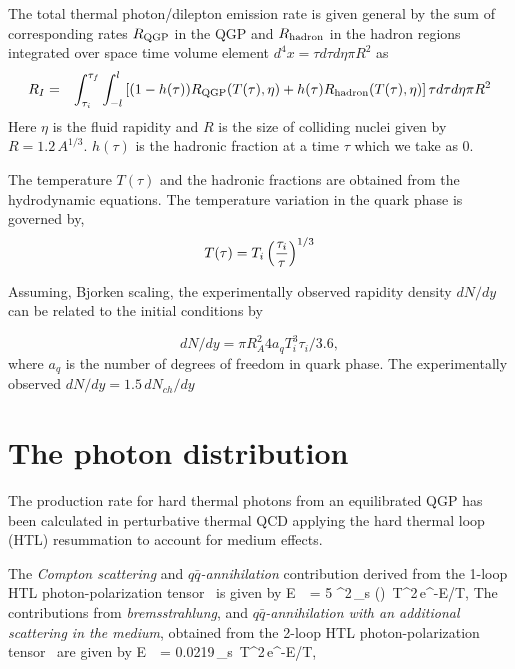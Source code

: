   The total thermal photon/dilepton emission rate is given general by 
the sum of corresponding rates $R_{\rm QGP}$ in the QGP and $R_{\rm hadron}$ in the hadron regions 
integrated over space time volume element $d^4x = \tau d\tau d\eta \pi R^2$ as
\begin{eqnarray}\label{}
R_I  &=& \int_{\tau_i}^{\tau_f} \int_{-l}^{l} 
      \left[(1-h(\tau)) R_{\rm QGP}(T(\tau),\eta) 
   + h(\tau)  R_{\rm hadron}(T(\tau),\eta) \right]\tau d\tau d\eta \pi R^2
\end{eqnarray}
Here $\eta$ is the fluid rapidity and $R$ is the size of colliding 
nuclei given by $R=1.2\, A^{1/3}$. $h(\tau)$ is the hadronic fraction
at a time $\tau$ which we take as 0. 

 The temperature $T(\tau)$ and the hadronic fractions are
obtained from the hydrodynamic equations. The temperature variation
in the quark phase is governed by,
\begin{eqnarray}\label{}
T(\tau) = T_i \left({\tau_i \over \tau}\right)^{1/3}
\end{eqnarray}

 Assuming, Bjorken scaling, the experimentally observed rapidity 
density $dN/dy$ can be related to the initial conditions by

\begin{equation}
dN/dy = \pi R_A^2 4 a_q T_i^3 \tau_i/3.6,
\end{equation}
where $a_q$ is the number of degrees of freedom in quark phase.
The experimentally observed $dN/dy=1.5\, dN_{ch}/dy$ 


\section{The photon distribution}

  The production rate for hard thermal photons from an equilibrated 
QGP has been calculated in
perturbative thermal QCD applying the hard thermal loop (HTL)
resummation to account for medium effects. 


The {\em Compton scattering} and {\em $q\bar{q}$-annihilation} contribution
derived from the 1-loop HTL photon-polarization 
tensor~\cite{KAPUSTA_1991,BAIER_1991,TRAXLER_1995} is given by
%
\be
 E\, \, =  {5 \pi^2}\,\alpha \alpha_s 
       \ln \left(\right)
            \,T^2\,e^{-E/T},
\label{1-loop}
\ee
%
The contributions from {\em bremsstrahlung}, 
and {\em $q\bar{q}$-annihilation with an additional scattering in the medium},
obtained from the 2-loop HTL photon-polarization
tensor~\cite{AURENCHE_1998,THOMA} are given by
%
\be
   E\, \, = 
        0.0219\,\alpha \alpha_s
        \,T^2\,e^{-E/T},
\label{bremss}
\ee
%

